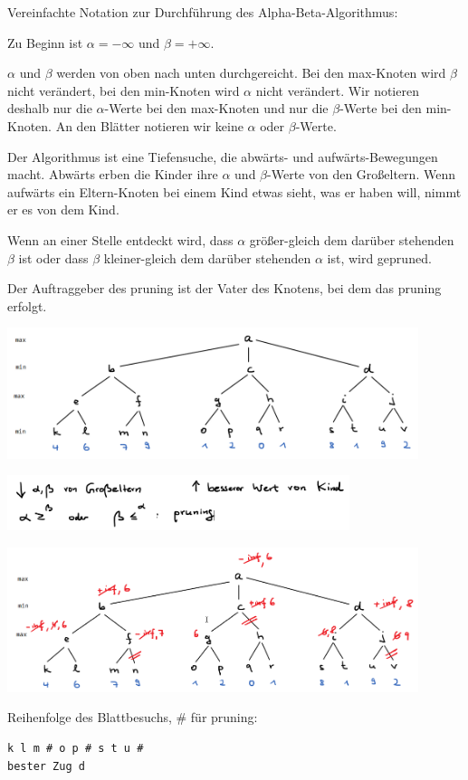 \begin{frame}[fragile]
Vereinfachte Notation zur Durchführung des Alpha-Beta-Algorithmus:

Zu Beginn ist $\alpha = -\infty$ und $\beta = +\infty$.

$\alpha$ und $\beta$ werden von oben nach unten durchgereicht. Bei den max-Knoten wird $\beta$ nicht verändert, bei den min-Knoten wird $\alpha$ nicht verändert. Wir notieren deshalb nur die $\alpha$-Werte bei den max-Knoten und nur die $\beta$-Werte bei den min-Knoten. An den Blätter notieren wir keine $\alpha$ oder $\beta$-Werte.

Der Algorithmus ist eine Tiefensuche, die abwärts- und aufwärts-Bewegungen macht. Abwärts erben die Kinder ihre  $\alpha$ und $\beta$-Werte von den Großeltern. Wenn aufwärts ein Eltern-Knoten bei einem Kind etwas sieht, was er haben will, nimmt er es von dem Kind.

Wenn an einer Stelle entdeckt wird, dass $\alpha$ größer-gleich dem darüber stehenden $\beta$ ist oder
dass $\beta$ kleiner-gleich dem darüber stehenden  $\alpha$ ist, wird gepruned.

Der Auftraggeber des pruning ist der Vater des Knotens, bei dem das pruning erfolgt.
\end{frame}

\begin{frame}[fragile]
\includegraphics[width=12cm]{bild14.png} 

\includegraphics[width=10cm]{kurzform.png} 



\end{frame}

\begin{frame}[fragile]
\includegraphics[width=12cm]{bild15a.png} 

Reihenfolge des Blattbesuchs,  \# für pruning:
\begin{lstlisting}
k l m # o p # s t u # 
bester Zug d
\end{lstlisting} 
\end{frame}



 